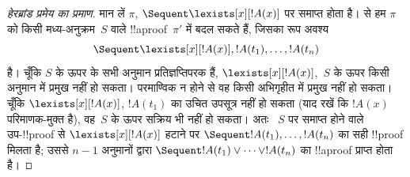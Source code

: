 \documentclass[../../../include/open-logic-section]{subfiles}
\begin{document}
\begin{proof}[हेरब्रांड प्रमेय का प्रमाण]
मान लें $\pi$, $\Sequent \lexists[x][!A(x)]$ पर समाप्त होता है।
 से हम $\pi$ को किसी मध्य-अनुक्रम~$S$ वाले
!!a{proof}~$\pi'$ में बदल सकते हैं, जिसका रूप अवश्य \[\Sequent
\lexists[x][!A(x)], !A(t_1), \dots, !A(t_n)\] है। चूँकि $S$ के ऊपर के सभी
अनुमान प्रतिज्ञप्तिपरक हैं, $\lexists[x][!A(x)]$,~$S$ के ऊपर किसी अनुमान में
प्रमुख नहीं हो सकता। परमाण्विक न होने से वह किसी अभिगृहीत में प्रमुख नहीं हो
सकता। चूँकि $\lexists[x][!A(x)]$, $!A(t_1)$ का उचित उपसूत्र नहीं हो सकता (याद
रखें कि $!A(x)$ परिमाणक-मुक्त है), वह~$S$ के ऊपर सक्रिय भी नहीं हो सकता। अतः
~$S$ पर समाप्त होने वाले उप-!!{proof} से $\lexists[x][!A(x)]$ हटाने पर
$\Sequent !A(t_1), \dots, !A(t_n)$ का सही !!{proof} मिलता है; उससे $n-1$
\RightR{\lor} अनुमानों द्वारा $\Sequent !A(t_1) \lor \dots \lor !A(t_n)$ का
!!a{proof} प्राप्त होता है।
\end{proof}

\end{document}
